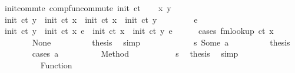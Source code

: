 \begin{isabellebody}
\isanewline
{}\isamarkupfalse%
\ init{\isacharunderscore}{\kern0pt}commte{\isacharcolon}{\kern0pt}\ {\isachardoublequoteopen}comp{\isacharunderscore}{\kern0pt}fun{\isacharunderscore}{\kern0pt}commute\ {\isacharparenleft}{\kern0pt}init\ ct{\isacharparenright}{\kern0pt}{\isachardoublequoteclose}\isanewline
%
\isadelimproof
%
\endisadelimproof
%
\isatagproof
{}\isamarkupfalse%
\isanewline
\ \ \isamarkupfalse%
\ x\ y\isanewline
\ \ \isamarkupfalse%
\ {\isachardoublequoteopen}init\ ct\ y\ {\isasymcirc}\ init\ ct\ x\ {\isacharequal}{\kern0pt}\ init\ ct\ x\ {\isasymcirc}\ init\ ct\ y{\isachardoublequoteclose}\isanewline
\ \ \isamarkupfalse%
\isanewline
\ \ \ \ \isamarkupfalse%
\ e\isanewline
\ \ \ \ \isamarkupfalse%
\ {\isachardoublequoteopen}{\isacharparenleft}{\kern0pt}init\ ct\ y\ {\isasymcirc}\ init\ ct\ x{\isacharparenright}{\kern0pt}\ e\ {\isacharequal}{\kern0pt}\ {\isacharparenleft}{\kern0pt}init\ ct\ x\ {\isasymcirc}\ init\ ct\ y{\isacharparenright}{\kern0pt}\ e{\isachardoublequoteclose}\isanewline
\ \ \ \ \isamarkupfalse%
\ {\isacharparenleft}{\kern0pt}cases\ {\isachardoublequoteopen}fmlookup\ ct\ x{\isachardoublequoteclose}{\isacharparenright}{\kern0pt}\isanewline
\ \ \ \ \ \ \isamarkupfalse%
\ None\isanewline
\ \ \ \ \ \ \isamarkupfalse%
\ \isamarkupfalse%
\ {\isacharquery}{\kern0pt}thesis\ \isamarkupfalse%
\ simp\isanewline
\ \ \ \ \isamarkupfalse%
\isanewline
\ \ \ \ \ \ \isamarkupfalse%
\ s{}{\isacharcolon}{\kern0pt}\ {\isacharparenleft}{\kern0pt}Some\ a{\isacharparenright}{\kern0pt}\isanewline
\ \ \ \ \ \ \isamarkupfalse%
\ \isamarkupfalse%
\ {\isacharquery}{\kern0pt}thesis\isanewline
\ \ \ \ \ \ \isamarkupfalse%
\ {\isacharparenleft}{\kern0pt}cases\ a{\isacharparenright}{\kern0pt}\isanewline
\ \ \ \ \ \ \ \ \isamarkupfalse%
\ {\isacharparenleft}{\kern0pt}Method\ {\isacharunderscore}{\kern0pt}{\isacharparenright}{\kern0pt}\isanewline
\ \ \ \ \ \ \ \ \isamarkupfalse%
\ s{}\ \isamarkupfalse%
\ {\isacharquery}{\kern0pt}thesis\ \isamarkupfalse%
\ simp\isanewline
\ \ \ \ \ \ \isamarkupfalse%
\isanewline
\ \ \ \ \ \ \ \ \isamarkupfalse%
\ {\isacharparenleft}{\kern0pt}Function\ {\isacharunderscore}{\kern0pt}{\isacharparenright}{\kern0pt}\isanewline
\ \ \ \ \ \ \ \ \isamarkupfalse%

\end{isabellebody}
